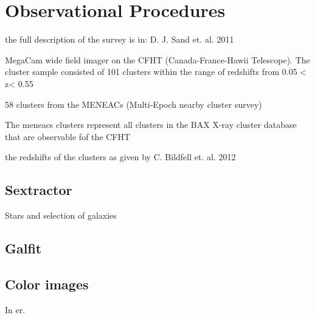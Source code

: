 
\chapter{Observational Procedures}

the full description of the survey is in: D. J. Sand et. al. 2011

MegaCam wide field imager on the CFHT (Canada-France-Hawii Telescope). The cluster sample consisted of 101 clusters within the range of redshifts from 0.05 < z< 0.55

58 clusters from the MENEACs (Multi-Epoch nearby cluster survey)

The meneacs clusters represent all clusters in the BAX X-ray cluster database that are observable fof the CFHT

the redshifts of the clusters as given by C. Bildfell et. al. 2012 

\section{Sextractor}

Stars and selection of galaxies

\section{Galfit}

\section{Color images}


In er.  